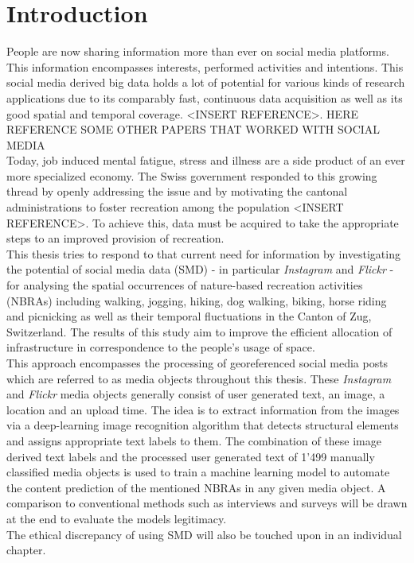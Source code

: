 
\chapter{Introduction}
People are now sharing information more than ever on social media platforms. This information encompasses interests, performed activities and intentions. This social media derived big data holds a lot of potential for various kinds of research applications due to its comparably fast, continuous data acquisition as well as its good spatial and temporal coverage. <INSERT REFERENCE>. HERE REFERENCE SOME OTHER PAPERS THAT WORKED WITH SOCIAL MEDIA \\
\newline
Today, job induced mental fatigue, stress and illness are a side product of an ever more specialized economy. The Swiss government responded to this growing thread by openly addressing the issue and by motivating the cantonal administrations to foster recreation among the population <INSERT REFERENCE>. To achieve this, data must be acquired to take the appropriate steps to an improved provision of recreation.\\
This thesis tries to respond to that current need for information by investigating the potential of social media data (SMD) - in particular \textit{Instagram} and \textit{Flickr} - for analysing the spatial occurrences of nature-based recreation activities (NBRAs) including walking, jogging, hiking, dog walking, biking, horse riding and picnicking as well as their temporal fluctuations in the Canton of Zug, Switzerland. The results of this study aim to improve the efficient allocation of infrastructure in correspondence to the people's usage of space. \\
\newline
This approach encompasses the processing of georeferenced social media posts which are referred to as media objects throughout this thesis. These \textit{Instagram} and \textit{Flickr} media objects generally consist of user generated text, an image, a location and an upload time. The idea is to extract information from the images via a deep-learning image recognition algorithm that detects structural elements and assigns appropriate text labels to them. The combination of these image derived text labels and the processed user generated text of 1'499 manually classified media objects is used to train a machine learning model to automate the content prediction of the mentioned NBRAs in any given media object. A comparison to conventional methods such as interviews and surveys will be drawn at the end to evaluate the models legitimacy. \\
The ethical discrepancy of using SMD will also be touched upon in an individual chapter.